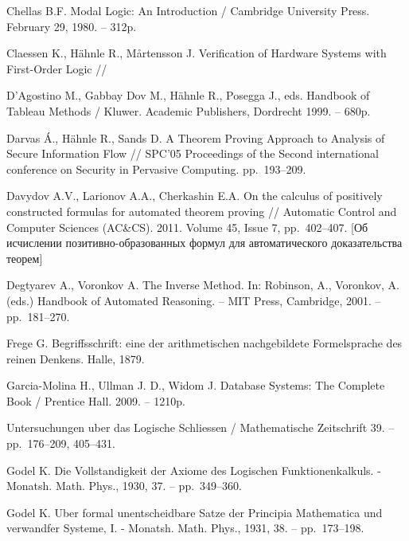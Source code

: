 \begin{thebibliography}{99}

 Chellas B.F. Modal Logic: An Introduction / Cambridge University Press. February 29, 1980. -- 312p.

 Claessen K., Hähnle R., Mårtensson J. Verification of Hardware Systems with First-Order Logic //

 D'Agostino M., Gabbay Dov M., Hähnle R., Posegga J., eds. Handbook of Tableau Methods /  Kluwer. Academic Publishers, Dordrecht 1999. -- 680p.

 Darvas Á., Hähnle R., Sands D. A Theorem Proving Approach to Analysis of Secure Information Flow // SPC'05 Proceedings of the Second international conference on Security in Pervasive Computing. pp.~193--209.


 Davydov A.V., Larionov A.A., Cherkashin E.A. On the calculus of positively constructed formulas for automated theorem proving // Automatic Control and Computer Sciences (AC\&CS). 2011. Volume 45, Issue 7, pp.~402--407. [Об исчислении позитивно-образованных формул для автоматического доказательства теорем]

 Degtyarev A., Voronkov A. The Inverse Method. In: Robinson, A., Voronkov, A. (eds.) Handbook of Automated Reasoning. -- MIT Press, Cambridge, 2001. -- pp.~181--270.


 Frege G. Begriffsschrift: eine der arithmetischen nachgebildete Formelsprache des reinen Denkens. Halle, 1879.

 Garcia-Molina H., Ullman J. D., Widom J. Database Systems: The Complete Book / Prentice Hall. 2009. -- 1210p.

 Untersuchungen uber das Logische Schliessen / Mathematische Zeitschrift 39. -- pp.~176--209, 405--431.


 Godel K. Die Vollstandigkeit der Axiome des Logischen Funktionenkalkuls. - Monatsh. Math. Phys., 1930, 37. -- pp.~349--360.

 Godel K. Uber formal unentscheidbare Satze der Principia Mathematica und verwandfer Systeme, I. - Monatsh. Math. Phys., 1931, 38. -- pp.~173--198.




\end{thebibliography}
